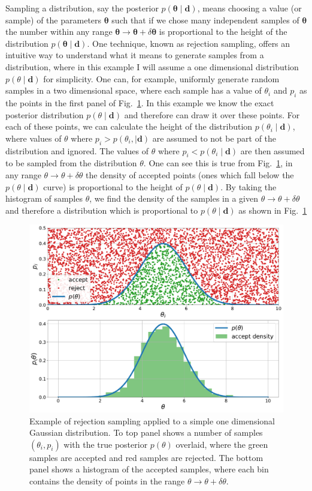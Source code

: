 Sampling a distribution, say the posterior $p(\bm{\theta} \mid \bm{d})$, means choosing a value (or sample) of the parameters $\bm{\theta}$ such that if we chose many independent samples of $\bm{\theta}$ the number within any range $\bm{\theta} \rightarrow \bm{\theta} + \delta \bm{\theta}$ is proportional to the height of the distribution $p(\bm{\theta} \mid \bm{d})$.
One technique, known as rejection sampling, offers an intuitive way to understand what it means to generate samples from a distribution, where in this example I will assume a one dimensional distribution $p(\theta \mid \bm{d})$ for simplicity.
One can, for example, uniformly generate random samples in a two dimensional space, where each sample has a value of $\theta_i$ and $p_i$ as the points in the first panel of Fig.~\ref{cwinto:bayes:sampling:rejection}.
In this example we know the exact posterior distribution $p(\theta \mid \bm{d})$ and therefore can draw it over these points. 
For each of these points, we can calculate the height of the distribution $p(\theta_i \mid \bm{d})$, where values of $\theta$ where $p_i > p(\theta_i, \mid \bm{d})$ are assumed to not be part of the distribution and ignored.
The values of $\theta$ where $p_i < p(\theta_i \mid \bm{d})$ are then assumed to be sampled from the distribution $\theta$.
One can see this is true from Fig.~\ref{cwinto:bayes:sampling:rejection}, in any range $\theta \rightarrow \theta + \delta \theta$ the density of accepted points (ones which fall below the $p(\theta \mid \bm{d})$ curve) is proportional to the height of $p(\theta \mid \bm{d})$.
By taking the histogram of samples $\theta$, we find the density of the samples in a given $\theta \rightarrow \theta + \delta \theta$ and therefore a distribution which is proportional to $p(\theta \mid \bm{d})$ as shown in Fig.~\ref{cwinto:bayes:sampling:rejection} 
%
\begin{figure}[ht]
	\centering
	\includegraphics[width=0.8\linewidth]{C2_cw/reject_sample.pdf}
	\caption[Rejection sampling example]{Example of rejection sampling applied to a simple one dimensional Gaussian distribution. To top panel shows a number of samples $(\theta_i, p_i)$ with the true posterior $p(\theta)$ overlaid, where the green samples are accepted and red samples are rejected. The bottom panel shows a histogram of the accepted samples, where each bin contains the density of points in the range $\theta \rightarrow \theta + \delta \theta$.}
	\label{cwinto:bayes:sampling:rejection}
\end{figure}
%

